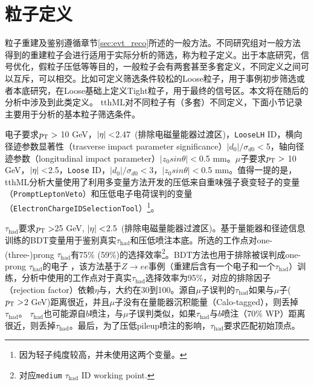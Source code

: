 \section{粒子定义}\label{sec:obj_tth}
粒子重建及鉴别遵循章节\ref{sec:evt_reco}所述的一般方法。不同研究组对一般方法得到的重建粒子会进行适用于实际分析的筛选，称为粒子定义。出于本底研究，信号优化，假粒子压低等等目的，一般粒子会有两套甚至多套定义，不同定义之间可以互斥，可以相交。比如可定义筛选条件较松的Loose粒子，用于事例初步筛选或者本底研究，在Loose基础上定义Tight粒子，用于最终的信号区。本文将在随后的分析中涉及到此类定义。
tthML对不同粒子有（多套）不同定义，下面小节记录主要用于\ltwotau 分析的基本粒子筛选条件。

电子要求$p_{\text{T}} >$ 10 GeV，$|\eta| <$2.47~(排除电磁量能器过渡区)，\texttt{LooseLH} ID，横向径迹参数显著性（trasverse impact parameter significance）$|d_0|/\sigma_{d0}<$5，轴向径迹参数（longitudinal impact parameter）$|z_0sin\theta|<$0.5 mm。$\mu$子要求$p_{\text{T}} >$ 10 GeV，$|\eta| <$2.5，\texttt{Loose} ID，$|d_0|/\sigma_{d0}<$3，$|z_0sin\theta|<$0.5 mm。值得一提的是，tthML分析大量使用了利用多变量方法开发的压低来自重味强子衰变轻子的变量（\texttt{PromptLeptonVeto}）和压低电子电荷误判的变量（\texttt{ElectronChargeIDSelectionTool}）\footnote{因为\ltwotau 轻子纯度较高，并未使用这两个变量。}。

$\tau_{\text{had}}$要求$p_{\text{T}} >$25 GeV, $|\eta| <$2.5~(排除电磁量能器过渡区)。基于量能器和径迹信息训练的BDT变量用于鉴别真实$\tau_{\text{had}}$和压低喷注本底。所选的工作点对one-(three-)prong $\tau_{\text{had}}$有75\% (59\%)的选择效率\footnote{对应\texttt{medium} $\tau_{\text{had}}$ ID working point.}。BDT方法也用于排除被误判成one-prong $\tau_{\text{had}}$的电子
，该方法基于$Z\rightarrow ee$事例（重建后含有一个电子和一个$\tau_{\text{had}}$）训练，分析中使用的工作点对于真实$\tau_{\text{had}}$选择效率为95\%，对应的排除因子（rejection factor）依赖$\eta$与\pt ，大约在30到100。源自$\mu$子误判的$\tau_{\text{had}}$如果与$\mu$子($p_{\text{T}} >$2 GeV)距离很近，并且$\mu$子没有在量能器沉积能量（Calo-tagged），则丢掉$\tau_{\text{had}}$。
$\tau_{\text{had}}$也可能源自$b$喷注，与$\mu$子误判类似，如果$\tau_{\text{had}}$与$b$喷注（70\% WP）距离很近，则丢掉$\tau_{\text{had}}$。最后，为了压低pileup喷注的影响，$\tau_{\text{had}}$要求匹配初始顶点。

